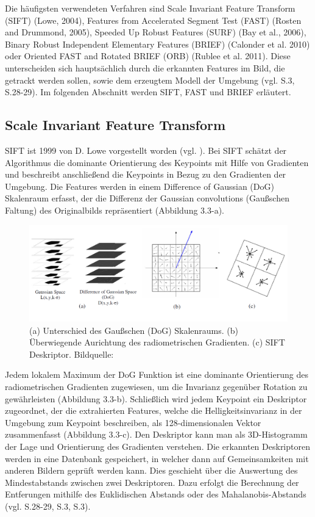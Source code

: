Die häufigsten verwendeten Verfahren sind \glqq Scale Invariant Feature Transform\grqq{} (SIFT) (Lowe, 2004), \glqq Features from Accelerated Segment Test\grqq{} (FAST) (Rosten and Drummond, 2005), \glqq Speeded Up Robust Features\grqq{} (SURF) (Bay et al., 2006), \glqq Binary Robust Independent Elementary Features\grqq{} (BRIEF) (Calonder et al. 2010) oder \glqq Oriented FAST and Rotated BRIEF\grqq{} (ORB) (Rublee et al. 2011). Diese unterscheiden sich hauptsächlich durch die erkannten Features im Bild, die getrackt werden sollen, sowie dem erzeugtem Modell der Umgebung (vgl. \cite{robust_feature} S.3, \cite{natural_feature} S.28-29). Im folgenden Abschnitt werden SIFT, FAST und BRIEF erläutert.

\subsection{Scale Invariant Feature Transform} 
SIFT ist 1999 von D. Lowe vorgestellt worden (vgl. \cite{sift}). Bei SIFT schätzt der Algorithmus die dominante Orientierung des Keypoints mit Hilfe von Gradienten und beschreibt anschließend die Keypoints in Bezug zu den Gradienten der Umgebung. Die Features werden in einem \glqq Difference of Gaussian\grqq{} (DoG) Skalenraum erfasst,  der die Differenz der \glqq Gaussian convolutions\grqq{} (Gaußschen Faltung) des Originalbilds repräsentiert (Abbildung 3.3-a).

\begin{figure}[H]
	\centering
	\includegraphics[scale=0.5]{sift.png}
	\caption{(a) Unterschied des Gaußschen (DoG) Skalenraums. (b) Überwiegende Aurichtung des radiometrischen Gradienten. (c) SIFT Deskriptor. Bildquelle: \cite{old_new_feature}}
\end{figure}

Jedem lokalem Maximum der DoG Funktion ist eine dominante Orientierung des radiometrischen Gradienten zugewiesen, um die Invarianz gegenüber Rotation zu gewährleisten (Abbildung 3.3-b).
Schließlich wird jedem Keypoint ein Deskriptor zugeordnet, der die extrahierten Features, welche die Helligkeitsinvarianz in der Umgebung zum Keypoint beschreiben, als 128-dimensionalen Vektor zusammenfasst (Abbildung 3.3-c). Den Deskriptor kann man als 3D-Histogramm der Lage und Orientierung des Gradienten verstehen. Die erkannten Deskriptoren werden in eine Datenbank gespeichert, in welcher dann auf Gemeinsamkeiten mit anderen Bildern geprüft werden kann. Dies geschieht über die Auswertung des Mindestabstands zwischen zwei Deskriptoren. Dazu erfolgt die Berechnung der Entferungen mithilfe des Euklidischen Abstands oder des Mahalanobis-Abstands  (vgl. \cite{natural_feature} S.28-29, \cite{det_des} S.3, \cite{old_new_feature} S.3). 

